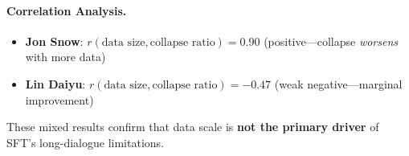 \documentclass[11pt]{article}
\begin{document}
\begin{CJK*}{UTF8}{gbsn}
\begin{table}[h]
\centering
\scriptsize
{}
\caption{Full data scale ablation results. Avg Len=average response length (chars); Rep.=repetitive responses per 30 turns; Collapse=2nd-half/1st-half avg. length ratio; Drop=sudden length decrease events.}
\label{tab:datasize_full}
\end{table}

\paragraph{Correlation Analysis.}
\begin{itemize}
    \item \textbf{Jon Snow}: $r(\text{data size}, \text{collapse ratio}) = 0.90$ (positive---collapse \textit{worsens} with more data)
    \item \textbf{Lin Daiyu}: $r(\text{data size}, \text{collapse ratio}) = -0.47$ (weak negative---marginal improvement)
\end{itemize}
These mixed results confirm that data scale is \textbf{not the primary driver} of SFT's long-dialogue limitations.


\end{CJK*}
\end{document}
